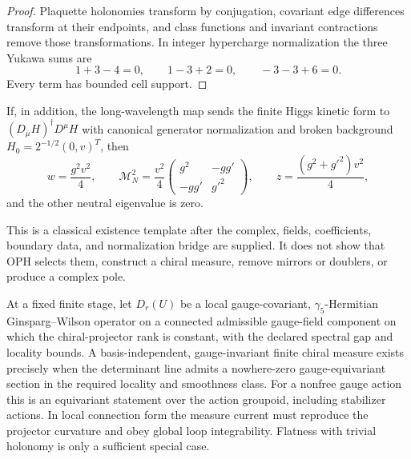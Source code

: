 \begin{proof}
Plaquette holonomies transform by conjugation, covariant edge differences
transform at their endpoints, and class functions and invariant contractions
remove those transformations. In integer hypercharge normalization the three
Yukawa sums are
\[
1+3-4=0,\qquad 1-3+2=0,\qquad -3-3+6=0.
\]
Every term has bounded cell support.
\end{proof}

\begin{corollary}
\label{cor:qft-q1-ew-tree-kernel}
If, in addition, the long-wavelength map sends the finite Higgs kinetic form
to \((D_\mu H)^\dagger D^\mu H\) with canonical generator normalization and
broken background \(H_0=2^{-1/2}(0,v)^T\), then
\[
w=\frac{g^2v^2}{4},\qquad
\mathcal M_N^2=\frac{v^2}{4}
\begin{pmatrix}g^2&-gg'\\-gg'&g'^2\end{pmatrix},
\qquad z=\frac{(g^2+g'^2)v^2}{4},
\]
and the other neutral eigenvalue is zero.
\end{corollary}

\begin{remark}
This is a classical existence template after the complex, fields,
coefficients, boundary data, and normalization bridge are supplied. It does
not show that OPH selects them, construct a chiral measure, remove mirrors or
doublers, or produce a complex pole.
\end{remark}

\begin{theorem}
\label{thm:qft-q2e-determinant-line}
At a fixed finite stage, let \(D_r(U)\) be a local gauge-covariant,
\(\gamma_5\)-Hermitian Ginsparg--Wilson operator on a connected admissible
gauge-field component on which the chiral-projector rank is constant, with
the declared spectral gap and locality bounds. A basis-independent,
gauge-invariant finite chiral measure exists precisely when the determinant
line admits a nowhere-zero gauge-equivariant section in the required locality
and smoothness class. For a nonfree gauge action this is an equivariant
statement over the action groupoid, including stabilizer actions. In local
connection form the measure current must reproduce the projector curvature
and obey global loop integrability. Flatness with trivial holonomy is only a
sufficient special case.
\end{theorem}

